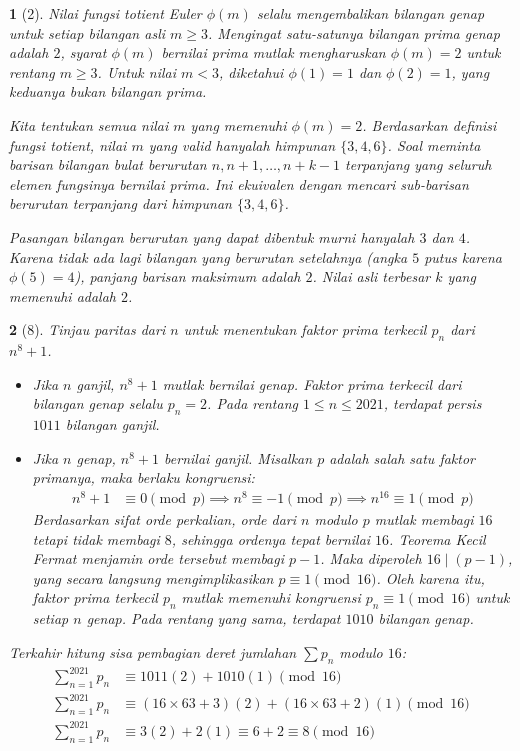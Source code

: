 \documentclass[11pt,a4paper,DIV=12]{scrartcl}
\theoremstyle{problemstyle}
\theoremstyle{answerstyle}
\newtheorem{answer}{}
\begin{document}
\begin{answer}[2]
  Nilai fungsi totient Euler $\phi(m)$ selalu mengembalikan bilangan genap untuk setiap bilangan asli $m \ge 3$. Mengingat satu-satunya bilangan prima genap adalah $2$, syarat $\phi(m)$ bernilai prima mutlak mengharuskan $\phi(m) = 2$ untuk rentang $m \ge 3$.
  Untuk nilai $m < 3$, diketahui $\phi(1) = 1$ dan $\phi(2) = 1$, yang keduanya bukan bilangan prima.

  Kita tentukan semua nilai $m$ yang memenuhi $\phi(m) = 2$. Berdasarkan definisi fungsi totient, nilai $m$ yang valid hanyalah himpunan $\{3, 4, 6\}$.
  Soal meminta barisan bilangan bulat berurutan $n, n+1, \dots, n+k-1$ terpanjang yang seluruh elemen fungsinya bernilai prima. Ini ekuivalen dengan mencari sub-barisan berurutan terpanjang dari himpunan $\{3, 4, 6\}$.

  Pasangan bilangan berurutan yang dapat dibentuk murni hanyalah $3$ dan $4$.
  Karena tidak ada lagi bilangan yang berurutan setelahnya (angka $5$ putus karena $\phi(5)=4$), panjang barisan maksimum adalah $2$.
  Nilai asli terbesar $k$ yang memenuhi adalah $\boxed{2}$.
\end{answer}

\begin{answer}[8]
  Tinjau paritas dari $n$ untuk menentukan faktor prima terkecil $p_n$ dari $n^8+1$.
  \begin{itemize}
    \item  Jika $n$ ganjil, $n^8+1$ mutlak bernilai genap. Faktor prima terkecil dari bilangan genap selalu $p_n = 2$. Pada rentang $1 \le n \le 2021$, terdapat persis $1011$ bilangan ganjil.
    \item Jika $n$ genap, $n^8+1$ bernilai ganjil. Misalkan $p$ adalah salah satu faktor primanya, maka berlaku kongruensi:
          \begin{align*}
            n^8 + 1 & \equiv 0 \pmod p                                   \implies
            n^8     \equiv -1 \pmod p \implies n^{16} \equiv 1 \pmod p
          \end{align*}
          Berdasarkan sifat orde perkalian, orde dari $n$ modulo $p$ mutlak membagi $16$ tetapi tidak membagi $8$, sehingga ordenya tepat bernilai $16$.
          Teorema Kecil Fermat menjamin orde tersebut membagi $p-1$. Maka diperoleh $16 \mid (p-1)$, yang secara langsung mengimplikasikan $p \equiv 1 \pmod{16}$.
          Oleh karena itu, faktor prima terkecil $p_n$ mutlak memenuhi kongruensi $p_n \equiv 1 \pmod{16}$ untuk setiap $n$ genap. Pada rentang yang sama, terdapat $1010$ bilangan genap.
  \end{itemize}
  Terkahir hitung sisa pembagian deret jumlahan $\sum p_n$ modulo $16$:
  \begin{align*}
    \sum_{n=1}^{2021} p_n & \equiv 1011(2) + 1010(1) \pmod{16}                             \\
    \sum_{n=1}^{2021} p_n & \equiv (16 \times 63 + 3)(2) + (16 \times 63 + 2)(1) \pmod{16} \\
    \sum_{n=1}^{2021} p_n & \equiv 3(2) + 2(1) \equiv 6 + 2 \equiv \boxed{8} \pmod{16}
  \end{align*}
\end{answer}
\end{document}
